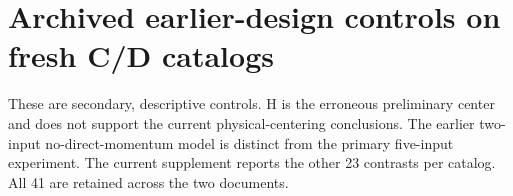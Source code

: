 \documentclass[11pt]{article}
\begin{document}
\section*{Archived earlier-design controls on fresh C/D catalogs}
These are secondary, descriptive controls. H is the erroneous preliminary
center and does not support the current physical-centering conclusions.
The earlier two-input no-direct-momentum model is distinct from the primary
five-input experiment. The current supplement reports the other 23
contrasts per catalog. All 41 are retained across the two documents.

\end{document}
